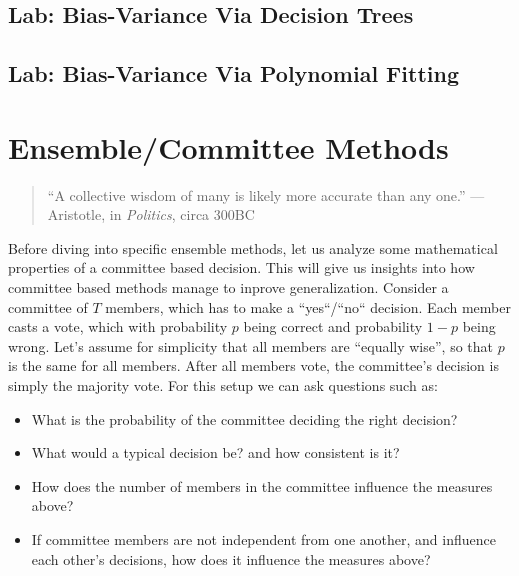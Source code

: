 
\subsection{Lab: Bias-Variance Via Decision Trees}
\subsection{Lab: Bias-Variance Via Polynomial Fitting}
        
\section{Ensemble/Committee Methods}
\begin{quote}
	``A collective wisdom of many is likely more accurate than any one.'' —
	Aristotle, in {\em Politics}, circa 300BC
\end{quote}

Before diving into specific ensemble methods, let us analyze some mathematical properties of a committee based decision. This will give us insights into how committee based methods manage to inprove generalization. Consider a committee of $T$ members, which has to make a ``yes``/``no`` decision. Each member casts a vote, which with probability $p$ being correct and probability $1-p$ being wrong. Let's assume for simplicity that all members are ``equally wise'', so that $p$ is the same for all members. After all members vote, the committee's decision is simply the majority vote. For this setup we can ask questions such as:
\begin{itemize}
	\item What is the probability of the committee deciding the right decision?
	\item What would a typical decision be? and how consistent is it?
	\item How does the number of members in the committee influence the measures above?
	\item If committee members are not independent from one another, and influence each other's decisions, how does it influence the measures above?
\end{itemize}
~\\

